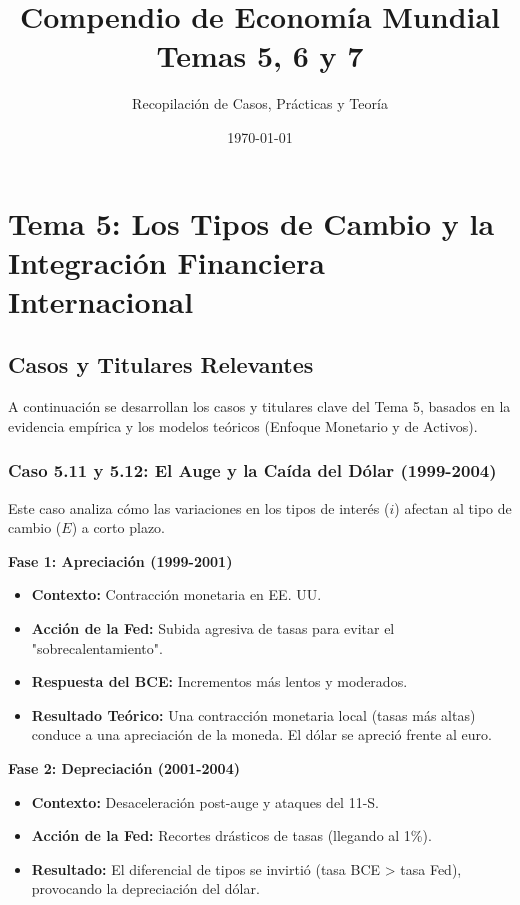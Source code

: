 \documentclass[a4paper,12pt]{report}
\theoremstyle{ejerciciostyle}
\newcommand{\nota}[2]{
    \begin{tcolorbox}[colframe=corporateblue, colback=corporatebg, title=\textbf{#1}]
        #2
    \end{tcolorbox}
}
\begin{document}
\title{\textbf{Compendio de Economía Mundial}\\Temas 5, 6 y 7}
\author{Recopilación de Casos, Prácticas y Teoría}
\date{\today}
\maketitle

\tableofcontents
\newpage

\chapter{Tema 5: Los Tipos de Cambio y la Integración Financiera Internacional}

\section{Casos y Titulares Relevantes}

A continuación se desarrollan los casos y titulares clave del Tema 5, basados en la evidencia empírica y los modelos teóricos (Enfoque Monetario y de Activos).

\subsection{Caso 5.11 y 5.12: El Auge y la Caída del Dólar (1999-2004)}
\nota{Análisis de Política Monetaria}{
Este caso analiza cómo las variaciones en los tipos de interés ($i$) afectan al tipo de cambio ($E$) a corto plazo.

\textbf{Fase 1: Apreciación (1999-2001)}
\begin{itemize}
    \item \textbf{Contexto:} Contracción monetaria en EE. UU.
    \item \textbf{Acción de la Fed:} Subida agresiva de tasas para evitar el "sobrecalentamiento".
    \item \textbf{Respuesta del BCE:} Incrementos más lentos y moderados.
    \item \textbf{Resultado Teórico:} Una contracción monetaria local (tasas más altas) conduce a una apreciación de la moneda. El dólar se apreció frente al euro.
\end{itemize}

\textbf{Fase 2: Depreciación (2001-2004)}
\begin{itemize}
    \item \textbf{Contexto:} Desaceleración post-auge y ataques del 11-S.
    \item \textbf{Acción de la Fed:} Recortes drásticos de tasas (llegando al 1\%).
    \item \textbf{Resultado:} El diferencial de tipos se invirtió (tasa BCE > tasa Fed), provocando la depreciación del dólar.
\end{itemize}
}
\end{document}
